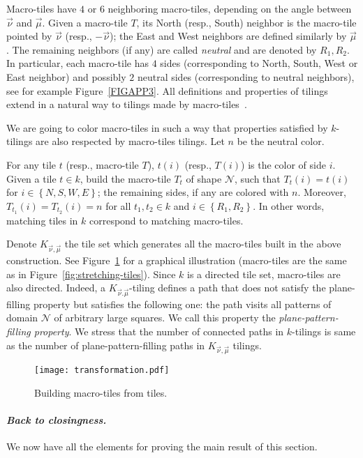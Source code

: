 \documentclass{llncs}
\newcommand{\set}[1]{\left\{#1\right\}}
\newcommand{\nn}{\vec\nu}
\newcommand{\mm}{\vec \mu}
\begin{document}
Macro-tiles have $4$ or $6$ neighboring macro-tiles, depending on
the angle between $\nn$ and $\mm$.
Given a macro-tile $T$, its North (resp., South) neighbor is the macro-tile pointed by $\nn$ (resp., $-\nn$); the East and West neighbors are defined similarly by $\mm$.
The remaining neighbors (if any) are called \emph{neutral} and
are denoted by $R_1,R_2$.
In particular, each macro-tile has $4$ sides (corresponding to North,
South, West or East neighbor) and possibly $2$ neutral sides (corresponding to neutral neighbors), see for example 
Figure~\ref{FIGAPP3}.
All definitions and properties of tilings extend in a natural way to 
tilings made by macro-tiles~\cite{LW08b,LW09b}.

We are going to color macro-tiles in
such a way that properties satisfied by $k$-tilings are also respected
by macro-tiles tilings. Let $n$ be the neutral color.

For any tile $t$ (resp., macro-tile $T$), $t(i)$ (resp., $T(i)$) is the
color of side $i$.
Given a tile $t\in k$, build the macro-tile $T_t$ of shape $\mathcal{N}$,
such that $T_t(i)=t(i)$ for $i\in\set{N,S,W,E}$; the remaining sides, if any are colored with 
$n$.  Moreover, $T_{t_1}(i)=T_{t_2}(i)=n$ for all $t_1,t_2\in k$ and
$i\in\set{R_1,R_2}$.
In other words, matching tiles in $k$ correspond to matching macro-tiles. 

Denote  $K_{\nn,\mm}$ the tile set which generates all the 
macro-tiles built in the above construction. See 
Figure~\ref{fig:tiles-macro-tiles} for a graphical illustration  
(macro-tiles are the same as in  Figure~\ref{fig:stretching-tiles}).
Since $k$ is a directed tile set, macro-tiles are also directed. 
Indeed, a $K_{\nn.\mm}$-tiling  defines a path that does not satisfy the plane-filling 
property but satisfies the following one:  the path visits all
patterns of domain $\mathcal{N}$ of arbitrary  large squares. 
We call this property the \emph{plane-pattern-filling property}.
We stress that the number of connected paths in $k$-tilings is same as the number
of plane-pattern-filling paths in $K_{\nn,\mm}$ tilings.

\begin{figure}
\begin{center}
\texttt{[image: transformation.pdf]}
\end{center}
\caption{Building macro-tiles from tiles.}
\label{fig:tiles-macro-tiles}
\end{figure}

\paragraph{\emph{Back to closingness.}} We now have all the 
elements for proving the main result of this section.
\end{document}
